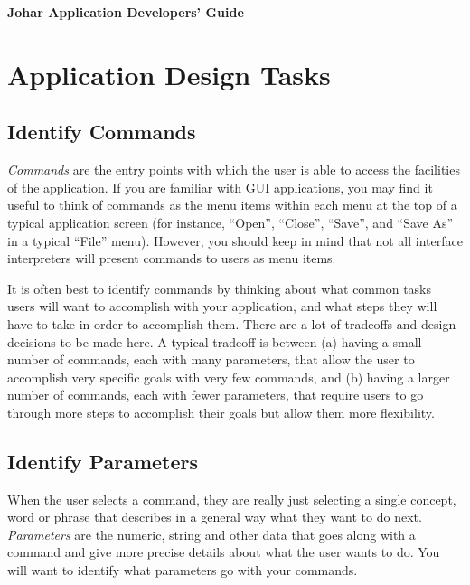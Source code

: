 \documentclass[11pt]{report}
\begin{document}
\begin{center} \bf \Large
Johar Application Developers' Guide
\end{center}

\section{Application Design Tasks}

\subsection{Identify Commands}

{\it Commands} are the entry points with which the user is able
to access the facilities of the application.  If you are
familiar with GUI applications, you may find it useful to think
of commands as the menu items within each menu at the top of a
typical application screen (for instance, ``Open'', ``Close'',
``Save'', and ``Save As'' in a typical ``File'' menu).  However,
you should keep in mind that not all interface interpreters will
present commands to users as menu items.

It is often best to identify commands by thinking about what
common tasks users will want to accomplish with your
application, and what steps they will have to take in order to
accomplish them.  There are a lot of tradeoffs and design
decisions to be made here.  A typical tradeoff is between (a)
having a small number of commands, each with many parameters,
that allow the user to accomplish very specific goals with very
few commands, and (b) having a larger number of commands, each
with fewer parameters, that require users to go through more
steps to accomplish their goals but allow them more flexibility.

\subsection{Identify Parameters}

When the user selects a command, they are really just selecting
a single concept, word or phrase that describes in a general way
what they want to do next.  {\it Parameters} are the numeric,
string and other data that goes along with a command and give
more precise details about what the user wants to do.  You will
want to identify what parameters go with your commands.
\end{document}
